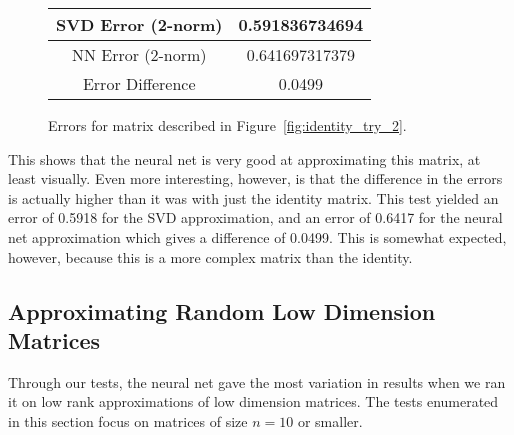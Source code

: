 \documentclass[a4paper,twoside]{article}
\begin{document}
\begin{figure}[H]
\centering
\begin{tabular}{|c|c|}
    \hline
    SVD Error (2-norm) & 0.591836734694\\
    \hline
    NN Error (2-norm) & 0.641697317379\\
    \hline
    Error Difference & 0.0499\\
    \hline
\end{tabular}
\caption{Errors for matrix described in Figure~\ref{fig:identity_try_2}.}
\label{fig:identity_try_2_errors}
\end{figure}

\indent This shows that the neural net is very good at approximating this matrix, at least visually. Even more interesting, however, is that the difference in the errors is actually higher than it was with just the identity matrix. This test yielded an error of 0.5918 for the SVD approximation, and an error of 0.6417 for the neural net approximation which gives a difference of 0.0499. This is somewhat expected, however, because this is a more complex matrix than the identity.

\subsection{Approximating Random Low Dimension Matrices}
\noindent Through our tests, the neural net gave the most variation in results when we ran it on low rank approximations of low dimension matrices. The tests enumerated in this section focus on matrices of size $n=10$ or smaller.



\end{document}
